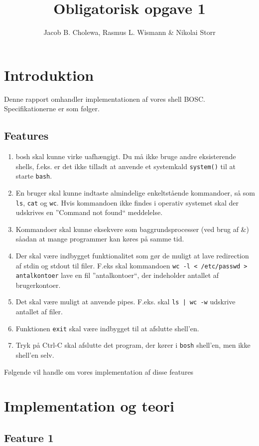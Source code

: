 \documentclass[danish]{report}
\title{Obligatorisk opgave 1}
\author{Jacob B. Cholewa, Rasmus L. Wismann \& Nikolai Storr }
\begin{document}
\maketitle

\chapter{Introduktion}
Denne rapport omhandler implementationen af vores shell BOSC. Specifikationerne er som følger.


\section{Features}
\begin{enumerate}
\item bosh skal kunne virke uafhængigt. Du må ikke bruge andre eksisterende shells, f.eks. er det ikke tilladt at anvende et systemkald {\tt system()} til at starte {\tt bash}.
\item En bruger skal kunne indtaste almindelige enkeltstående kommandoer, så som {\tt ls}, {\tt cat} og {\tt wc}. Hvis kommandoen ikke findes i operativ systemet skal der udskrives en ”Command not found“ meddelelse.
\item Kommandoer skal kunne eksekvere som baggrundsprocesser (ved brug af \&) såadan at mange programmer kan køres på samme tid.
\item Der skal være indbygget funktionalitet som gør de muligt at lave redirection af stdin og stdout til filer. F.eks skal kommandoen {\tt wc -l < /etc/passwd > antalkontoer} lave en fil ”antalkontoer“, der indeholder antallet af brugerkontoer.
\item Det skal være muligt at anvende pipes. F.eks. skal {\tt ls | wc -w} udskrive antallet af filer.
\item Funktionen {\tt exit} skal være indbygget til at afslutte shell’en.
\item Tryk på Ctrl-C skal afslutte det program, der kører i {\tt bosh} shell’en, men ikke shell’en selv.
\end{enumerate}

Følgende vil handle om vores implementation af disse features 


\chapter{Implementation og teori}
\section{Feature 1}
\end{document}
